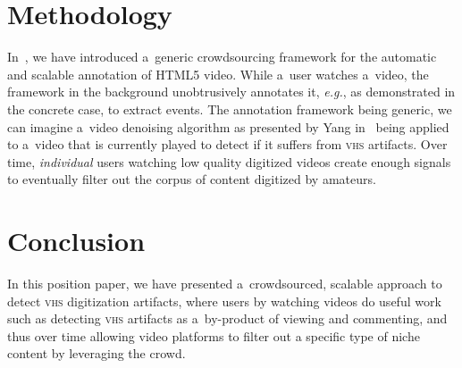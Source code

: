 \documentclass[runningheads,a4paper]{llncs}
\begin{document}
\vspace{-3em}

\section{Methodology}

In~\cite{steiner2011crowdsourcing}, we have introduced
a~generic crowdsourcing framework for the automatic and scalable
annotation of HTML5 video.
While a~user watches a~video, the framework in the background
unobtrusively annotates it, \emph{e.g.}, as demonstrated
in the concrete case, to extract events.
The annotation framework being generic,
we can imagine a~video denoising algorithm
as presented by Yang in~\cite{yang2009videonoise}
being applied to a~video that is currently played
to detect if it suffers from {\scshape vhs} artifacts.
Over time, \emph{individual} users watching low quality digitized videos
create enough signals to eventually filter out the corpus of
content digitized by amateurs.

\vspace{-0.5em}

\section{Conclusion}

In this position paper, we have presented a~crowdsourced,
scalable approach to detect {\scshape vhs} digitization artifacts,
where users by watching videos do useful work such as
detecting {\scshape vhs} artifacts as a~by-product of viewing and commenting,
and thus over time allowing video platforms to filter out
a specific type of niche content by leveraging the crowd.

\vspace{-0.5em}

\footnotesize


\end{document}
